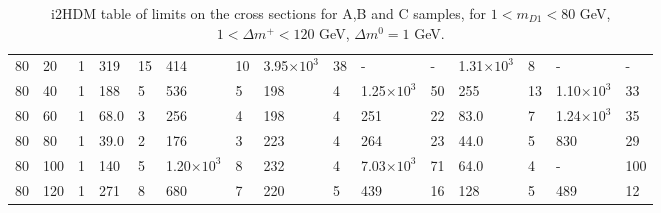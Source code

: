 \begin{table}[!ht]
\begin{center}
{\begin{tabular}{|l|l|l||l|l|l|l|l|l||l|l|l|l|l|l|}
80	&	20	&	1	&	319	&	15	&	414	&	10	&	3.95$\times10^3$	&	38	&	-	&	-	&	1.31$\times10^3$	&	8	&	-	&	-	\\



80	&	40	&	1	&	188	&	5	&	536	&	5	&	198	&	4	&	1.25$\times10^3$	&	50	&	255	&	13	&	1.10$\times10^3$	&	33	\\



80	&	60	&	1	&	68.0	&	3	&	256	&	4	&	198	&	4	&	251	&	22	&	83.0	&	7	&	1.24$\times10^3$	&	35	\\



80	&	80	&	1	&	39.0	&	2	&	176	&	3	&	223	&	4	&	264	&	23	&	44.0	&	5	&	830	&	29	\\

80	&	100	&	1	&	140	&	5	&	1.20$\times10^3$	&	8	&	232	&	4	&	7.03$\times10^3$	&	71	&	64.0	&	4	&	-	&	100	\\

80	&	120	&	1	&	271	&	8	&	680	&	7	&	220	&	5	&	439	&	16	&	128	&	5	&	489	&	12	\\

		\end{tabular}%
	}
\caption{i2HDM table of limits on the cross sections for A,B and C samples, for $1<m_{D1}<80$ GeV, $1<\Delta m^+<120$ GeV, $\Delta m^0=1$ GeV.}
\label{tab:i2hdm_exc_1}
\end{center}
\end{table}

\clearpage

